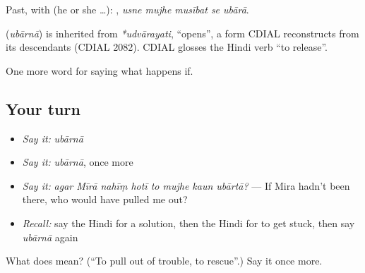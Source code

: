 Past, with  (he or she …):     , \emph{usne mujhe musībat se ubārā}.

\begin{cousinweb}
\textbf{} (\emph{ubārnā}) is inherited from \emph{*udvārayati}, \textquotedblleft{}opens\textquotedblright{}, a form CDIAL reconstructs from its descendants (CDIAL 2082). CDIAL glosses the Hindi verb \textquotedblleft{}to release\textquotedblright{}.
\end{cousinweb}

\begin{grammarlens}[title={What you've built}]
One more word for saying what happens if.
\end{grammarlens}

\subsection*{Your turn}
\begin{itemize}
\raggedright
  \item \emph{Say it:} \emph{ubārnā}
  \item \emph{Say it:} \emph{ubārnā}, once more
  \item \emph{Say it:} \emph{agar Mīrā nahīṃ hotī to mujhe kaun ubārtā?} — If Mira hadn't been there, who would have pulled me out?
  \item \emph{Recall:} say the Hindi for a solution, then the Hindi for to get stuck, then say \emph{ubārnā} again
\end{itemize}

\begin{tcolorbox}[breakable,colback=teal!4,colframe=teal!35!black,title={Before you move on}]
What does  mean? (\textquotedblleft{}To pull out of trouble, to rescue\textquotedblright{}.) Say it once more.
\end{tcolorbox}
